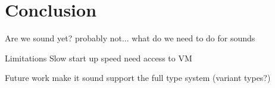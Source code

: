 \section{Conclusion}
\label{sec:conclusion}

\begin{outline}

\1 Are we sound yet?
    \2 probably not...
    \2 what do we need to do for sounds

\1 Limitations
    \2 Slow start up speed
    \2 need access to VM

\1 Future work
    \2 make it sound
    \2 support the full type system (variant types?)

\end{outline}